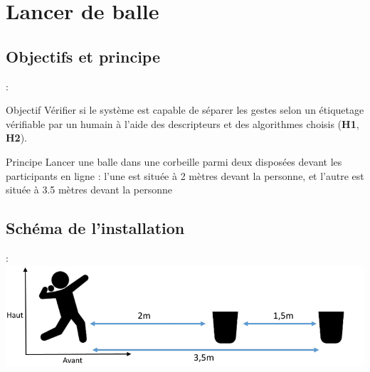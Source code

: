 \documentclass[svgnames]{beamer}
\begin{document}
	\section{Lancer de balle}
	\subsection{Objectifs et principe}
	\begin{frame}{\secname : \subsecname}
		\begin{block}{Objectif}
			Vérifier si le système est capable de séparer les gestes selon un étiquetage vérifiable par un humain à l'aide des descripteurs et des algorithmes choisis (\textbf{H1}, \textbf{H2}).
		\end{block}
	
		\begin{block}{Principe}
			Lancer une balle dans une corbeille parmi deux disposées devant les participants en ligne : l'une est située à 2 mètres devant la personne, et l'autre est située à 3.5 mètres devant la personne
		\end{block}
		
	\end{frame}
	
	\subsection{Schéma de l'installation}
	\begin{frame}{\subsecname : \subsecname}
		\centering
		\includegraphics[scale=0.5]{img/ball_throwing.png}
	\end{frame}
	
\end{document}
